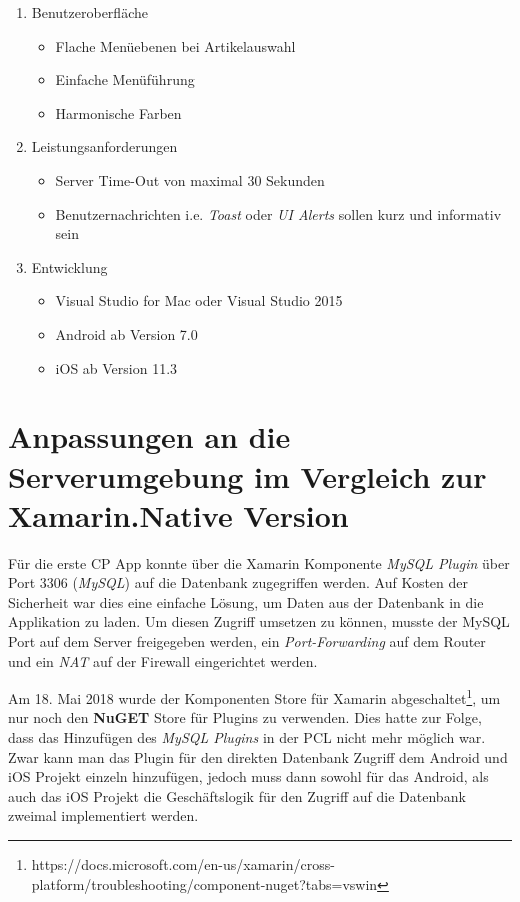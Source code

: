 	\begin{enumerate}
		\setlength\itemsep{0em}
		\item Benutzeroberfläche
		\begin{itemize}
			\setlength\itemsep{0em}
			\item Flache Menüebenen bei Artikelauswahl
			\item Einfache Menüführung
			\item Harmonische Farben
		\end{itemize}
		\item Leistungsanforderungen
		\begin{itemize}
			\item Server Time-Out von maximal 30 Sekunden
			\item Benutzernachrichten i.e. \textit{Toast} oder \textit{UI Alerts} sollen kurz und informativ sein
		\end{itemize}
		\item Entwicklung
		\begin{itemize}
			\item Visual Studio for Mac oder Visual Studio 2015
			\item Android ab Version 7.0
			\item iOS ab Version 11.3
		\end{itemize}
	\end{enumerate}

	\newpage

\section{Anpassungen an die Serverumgebung im Vergleich zur Xamarin.Native Version}
\label{sec:mckbspecs}

	Für die erste CP App konnte über die Xamarin Komponente \textit{MySQL Plugin} über Port 3306 (\textit{MySQL}) auf die Datenbank zugegriffen werden\cite{Maximilian2017}. Auf Kosten der Sicherheit war dies eine einfache Lösung, um Daten aus der Datenbank in die Applikation zu laden. Um diesen Zugriff umsetzen zu können, musste der MySQL Port auf dem Server freigegeben werden, ein \textit{Port-Forwarding} auf dem Router und ein \textit{NAT} auf der Firewall eingerichtet werden.

	Am 18. Mai 2018 wurde der Komponenten Store für Xamarin abgeschaltet\footnote{https://docs.microsoft.com/en-us/xamarin/cross-platform/troubleshooting/component-nuget?tabs=vswin}, um nur noch den \textbf{NuGET} Store für Plugins zu verwenden. Dies hatte zur Folge, dass das Hinzufügen des \textit{MySQL Plugins} in der PCL nicht mehr möglich war. Zwar kann man das Plugin für den direkten Datenbank Zugriff dem Android und iOS Projekt einzeln hinzufügen, jedoch muss dann sowohl für das Android, als auch das iOS Projekt die Geschäftslogik für den Zugriff auf die Datenbank zweimal implementiert werden.

